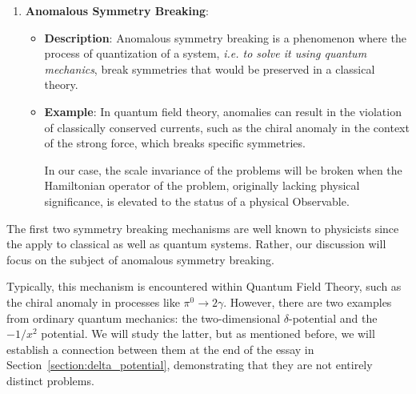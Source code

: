 \begin{enumerate}
\begin{itemize}
                    This phenomenon is a classic example of spontaneous symmetry breaking in classical physics and is responsible for the behavior of permanent magnets and the Earth's magnetic field.

                    Or, in a more abstract example, but one that resembles the problem we will discuss: a particle in a symmetric double well potential. Even though the system possesses parity symmetry, in Quantum Mechanics, the particle spontaneously chooses one well over the other, breaking the symmetry.
          \end{itemize}

    \item \textbf{Anomalous Symmetry Breaking}:
          \begin{itemize}
              \item \textbf{Description}: Anomalous symmetry breaking is a phenomenon where the process of quantization of a system, \textit{i.e. to solve it using quantum mechanics}, break symmetries that would be preserved in a classical theory.
              \item \textbf{Example}: In quantum field theory, anomalies can result in the violation of classically conserved currents, such as the chiral anomaly in the context of the strong force, which breaks specific symmetries.

                    In our case, the scale invariance of the problems will be broken when the Hamiltonian operator of the problem, originally lacking physical significance, is elevated to the status of a physical Observable.
          \end{itemize}
\end{enumerate}

\noindent
The first two symmetry breaking mechanisms are well known to physicists since the apply to classical as well as quantum systems.
Rather, our discussion will focus on the subject of anomalous symmetry breaking.

Typically, this mechanism is encountered within Quantum Field Theory, such as the chiral anomaly in processes like $\pi^0 \rightarrow 2 \gamma$. However, there are two examples from ordinary quantum mechanics: the two-dimensional $\delta$-potential and the $-1/x^2$ potential. We will study the latter, but as mentioned before, we will establish a connection between them at the end of the essay in Section~\ref{section:delta_potential}, demonstrating that they are not entirely distinct problems.